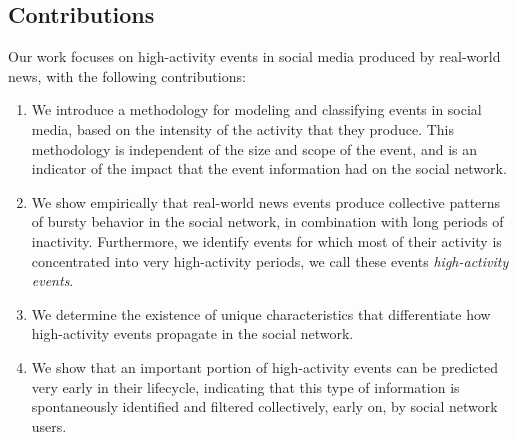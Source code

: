 


\subsection{Contributions}

Our work focuses on high-activity events in social media produced by real-world
news, with the following contributions:
\begin{enumerate}

\item We introduce a methodology for modeling and classifying events in social
media, based on the intensity of the activity that they produce. 
%
This methodology is independent of the size and scope of the event, and is an
indicator of the impact that the event information had on the social network.

\item We show empirically that real-world news events produce collective
patterns of bursty behavior in the social network, in combination with long periods of
inactivity. 
%
Furthermore, we identify events for which most of their activity is concentrated
into very high-activity periods, we call these events {\em high-activity
events}.

\item We determine the existence of unique characteristics that differentiate
how high-activity events propagate in the social network.

\item We show that an important portion of high-activity events can be predicted
very early in their lifecycle, indicating that this type of information is
spontaneously identified and filtered collectively, early on, by social network
users.

\end{enumerate}

